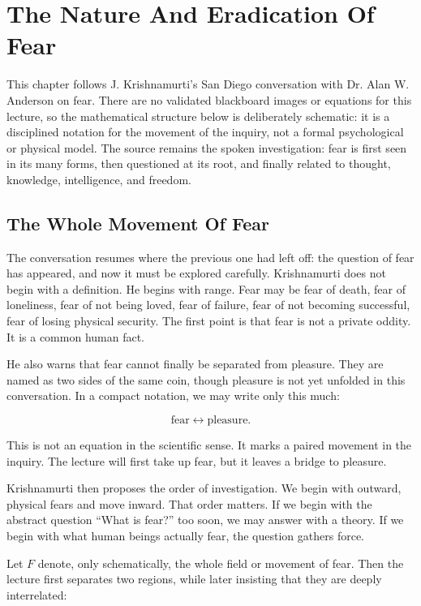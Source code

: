 \chapter{The Nature And Eradication Of Fear}

This chapter follows J. Krishnamurti's San Diego conversation with Dr. Alan W. Anderson on fear. There are no validated blackboard images or equations for this lecture, so the mathematical structure below is deliberately schematic: it is a disciplined notation for the movement of the inquiry, not a formal psychological or physical model. The source remains the spoken investigation: fear is first seen in its many forms, then questioned at its root, and finally related to thought, knowledge, intelligence, and freedom.

\section{The Whole Movement Of Fear}

The conversation resumes where the previous one had left off: the question of fear has appeared, and now it must be explored carefully. Krishnamurti does not begin with a definition. He begins with range. Fear may be fear of death, fear of loneliness, fear of not being loved, fear of failure, fear of not becoming successful, fear of losing physical security. The first point is that fear is not a private oddity. It is a common human fact.

He also warns that fear cannot finally be separated from pleasure. They are named as two sides of the same coin, though pleasure is not yet unfolded in this conversation. In a compact notation, we may write only this much:

\begin{equation}
\text{fear} \leftrightarrow \text{pleasure}.
\end{equation}

This is not an equation in the scientific sense. It marks a paired movement in the inquiry. The lecture will first take up fear, but it leaves a bridge to pleasure.

Krishnamurti then proposes the order of investigation. We begin with outward, physical fears and move inward. That order matters. If we begin with the abstract question ``What is fear?'' too soon, we may answer with a theory. If we begin with what human beings actually fear, the question gathers force.

Let \(F\) denote, only schematically, the whole field or movement of fear. Then the lecture first separates two regions, while later insisting that they are deeply interrelated:

